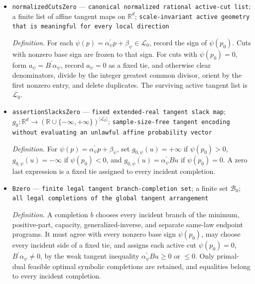 \documentclass{article}
\begin{document}
\begin{itemize}
  \par\smallskip\noindent\emph{Definition.} \(\mathscr L_0\) is the complete finite rational list \(\psi(p)=\alpha_{\psi}^{\prime}p+\beta_{\psi}\) obtained from every branch inequality for the minimum, positive-part, capacity, and generalized-inverse operations, every primal and dual feasibility or optimality inequality for the separate endpoint programs over \(\Xi(p)\), and every affine semantic assertion inequality. The list is evaluated at \(p_0\) before localizing; no expression \(p_0+Bu\) is treated as a probability law.
  \item \texttt{normalizedCutsZero} --- \texttt{canonical normalized rational active-\allowbreak{}cut list}; a finite list of affine tangent maps on \(\mathbb R^d\); \texttt{scale-\allowbreak{}invariant active geometry that is meaningful for every local direction}
  \par\smallskip\noindent\emph{Definition.} For each \(\psi(p)=\alpha_{\psi}^{\prime}p+\beta_{\psi}\in\mathscr L_0\), record the sign of \(\psi(p_0)\). Cuts with nonzero base sign are frozen to that sign. For cuts with \(\psi(p_0)=0\), form \(a_{\psi}=B^{\prime}\alpha_{\psi}\), record \(a_{\psi}=0\) as a fixed tie, and otherwise clear denominators, divide by the integer greatest common divisor, orient by the first nonzero entry, and delete duplicates. The surviving active tangent list is \(\overline{\mathscr L}_0\).
  \item \texttt{assertionSlacksZero} --- \texttt{fixed extended-\allowbreak{}real tangent slack map}; \(g_0:\mathbb R^d\to(\mathbb R\cup\{-\infty,+\infty\})^{|\mathscr L_0|}\); \texttt{sample-\allowbreak{}size-\allowbreak{}free tangent encoding without evaluating an unlawful affine probability vector}
  \par\smallskip\noindent\emph{Definition.} For \(\psi(p)=\alpha_{\psi}^{\prime}p+\beta_{\psi}\), set \(g_{0,\psi}(u)=+\infty\) if \(\psi(p_0)>0\), \(g_{0,\psi}(u)=-\infty\) if \(\psi(p_0)<0\), and \(g_{0,\psi}(u)=\alpha_{\psi}^{\prime}Bu\) if \(\psi(p_0)=0\). A zero last expression is a fixed tie assigned to every incident completion.
  \item \texttt{Bzero} --- \texttt{finite legal tangent branch-\allowbreak{}completion set}; a finite set \(\mathcal B_0\); \texttt{all legal completions of the global tangent arrangement}
  \par\smallskip\noindent\emph{Definition.} A completion \(b\) chooses every incident branch of the minimum, positive-part, capacity, generalized-inverse, and separate same-law endpoint programs. It must agree with every nonzero base sign \(\psi(p_0)\), may choose every incident side of a fixed tie, and assigns each active cut \(\psi(p_0)=0\), \(B^{\prime}\alpha_{\psi}\ne0\), by the weak tangent inequality \(\alpha_{\psi}^{\prime}Bu\ge0\) or \(\le0\). Only primal-dual feasible optimal symbolic completions are retained, and equalities belong to every incident completion.

\end{itemize}
\end{document}
